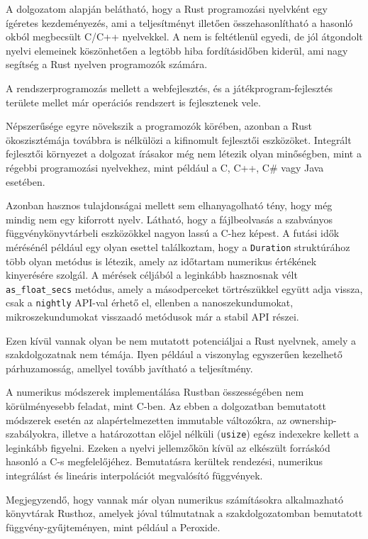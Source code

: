 A dolgozatom alapján belátható, hogy a Rust programozási nyelvként egy ígéretes kezdeményezés, ami a teljesítményt illetően összehasonlítható a hasonló okból megbecsült C/C++ nyelvekkel. A nem is feltétlenül egyedi, de jól átgondolt nyelvi elemeinek köszönhetően a legtöbb hiba fordításidőben kiderül, ami nagy segítség a Rust nyelven programozók számára.

A rendszerprogramozás mellett a webfejlesztés, és a játékprogram-fejlesztés területe mellet már operációs rendszert is fejlesztenek vele.

Népszerűsége egyre növekszik a programozók körében, azonban a Rust ökoszisztémája továbbra is nélkülözi a kifinomult fejlesztői eszközöket. Integrált fejlesztői környezet a dolgozat írásakor még nem létezik olyan minőségben, mint a régebbi programozási nyelvekhez, mint például a C, C++, C\# vagy Java esetében.

Azonban hasznos tulajdonságai mellett sem elhanyagolható tény, hogy még mindig nem egy kiforrott nyelv. Látható, hogy a fájlbeolvasás a szabványos függvénykönyvtárbeli eszközökkel nagyon lassú a C-hez képest. A futási idők mérésénél például egy olyan esettel találkoztam, hogy a \lstinline{Duration} struktúrához több olyan metódus is létezik, amely az időtartam numerikus értékének kinyerésére szolgál. A mérések céljából a leginkább hasznosnak vélt \lstinline{as_float_secs} metódus, amely a másodperceket törtrészükkel együtt adja vissza, csak a \lstinline{nightly} API-val érhető el, ellenben a nanoszekundumokat, mikroszekundumokat visszaadó metódusok már a stabil API részei.

Ezen kívül vannak olyan be nem mutatott potenciáljai a Rust nyelvnek, amely a szakdolgozatnak nem témája. Ilyen például a viszonylag egyszerűen kezelhető párhuzamosság, amellyel tovább javítható a teljesítmény.

A numerikus módszerek implementálása Rustban összességében nem körülményesebb feladat, mint C-ben. Az ebben a dolgozatban bemutatott módszerek esetén az alapértelmezetten immutable változókra, az ownership-szabályokra, illetve a határozottan előjel nélküli (\lstinline{usize}) egész indexekre kellett a leginkább figyelni. Ezeken a nyelvi jellemzőkön kívül az elkészült forráskód hasonló a C-s megfelelőjéhez. Bemutatásra kerültek rendezési, numerikus integrálást és lineáris interpolációt megvalósító függvények.

Megjegyzendő, hogy vannak már olyan numerikus számításokra alkalmazható könyvtárak Rusthoz, amelyek jóval túlmutatnak a szakdolgozatomban bemutatott függvény-gyűjteményen, mint például a Peroxide. %

